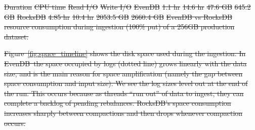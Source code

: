 \documentclass[sigplan,10pt]{acmart}
\newcommand{\sys}{EvenDB}
\providecommand{\DIFdel}[1]{{\protect\color{red}\sout{#1}}}                      %
\providecommand{\DIFdelbegin}{} %
\providecommand{\DIFdelend}{} %
\providecommand{\DIFdelFL}[1]{\DIFdel{#1}} %
\begin{document}
\DIFdelbegin %
\DIFdelFL{Duration
 }%
\DIFdelFL{CPU time  }%
\DIFdelFL{Read I/O }%
\DIFdelFL{Write I/O}%
\DIFdelFL{\sys }%
\DIFdelFL{1.1 hr }%
\DIFdelFL{14.6 hr }%
\DIFdelFL{47.6 GB 	}%
\DIFdelFL{645.2	GB }%
\DIFdelFL{RocksDB }%
\DIFdelFL{4.85 hr }%
\DIFdelFL{10.4 hr }%
\DIFdelFL{2053.5 GB }%
\DIFdelFL{2660.4	GB}%
{%
\DIFdelFL{\sys\/ vs RocksDB resource consumption during ingestion (100\% put) of a 256GB production dataset.}}

\DIFdel{Figure~\ref{fig:space_timeline} shows the disk space used during the ingestion. In \sys\, the space occupied by logs (dotted line) grows linearly with the data size, and is the main reason for space amplification (namely the gap between space consumption and input size). We see the log sizes level out at the end of the run. This occurs because as threads ``run out'' of data to ingest, they can complete a backlog of pending rebalances. 
RocksDB's space consumption increases sharply between compactions and then drops whenever compaction occurs. 
}%

\DIFdelend %
\end{document}
